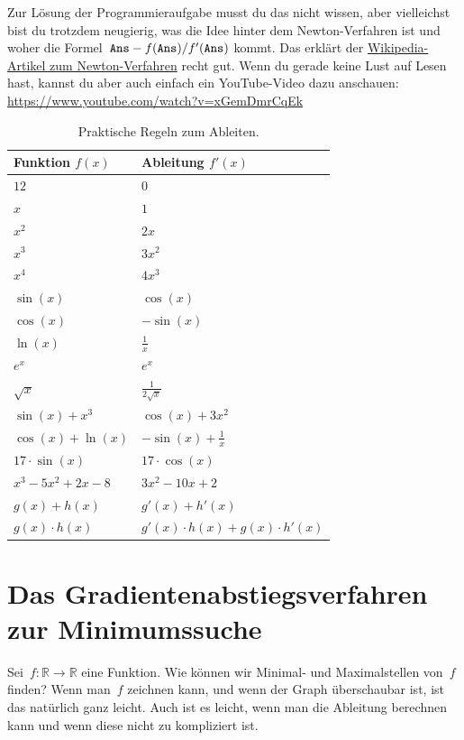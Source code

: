 \documentclass{blatt}
\newcommand{\RR}{\mathbb{R}}
\begin{document}
Zur Lösung der Programmieraufgabe musst du das nicht wissen, aber vielleichst
bist du trotzdem neugierig, was die Idee hinter dem Newton-Verfahren ist und
woher die Formel~$\texttt{Ans} - f(\texttt{Ans})/f'(\texttt{Ans})$ kommt. Das erklärt der
\href{https://de.wikipedia.org/wiki/Newton-Verfahren}{Wikipedia-Artikel zum
Newton-Verfahren} recht gut. Wenn du gerade keine Lust auf Lesen hast, kannst
du aber auch einfach ein YouTube-Video dazu anschauen:
\url{https://www.youtube.com/watch?v=xGemDmrCqEk}

\begin{table}
  \centering
  \begin{tabular}{ll}
    \toprule
    Funktion $f(x)$ & Ableitung $f'(x)$ \\\midrule
    $12$ & $0$ \\
    $x$ & $1$ \\
    $x^2$ & $2x$ \\
    $x^3$ & $3x^2$ \\
    $x^4$ & $4x^3$ \\
    $\sin(x)$ & $\cos(x)$ \\
    $\cos(x)$ & $-\sin(x)$ \\
    $\ln(x)$ & $\frac{1}{x}$ \\
    $e^x$ & $e^x$ \\
    $\sqrt{x}$ & $\frac{1}{2\sqrt{x}}$ \\
    $\sin(x)+x^3$ & $\cos(x)+3x^2$ \\
    $\cos(x)+\ln(x)$ & $-\sin(x)+\frac{1}{x}$ \\
    $17 \cdot \sin(x)$ & $17 \cdot \cos(x)$ \\
    $x^3-5x^2+2x-8$ & $3x^2-10x+2$ \\
    $g(x)+h(x)$ & $g'(x)+h'(x)$ \\
    $g(x) \cdot h(x)$ & $g'(x) \cdot h(x) + g(x) \cdot h'(x)$ \\
    \bottomrule
  \end{tabular}
  \caption{\label{tab:ableitungsregeln}Praktische Regeln zum Ableiten.}
\end{table}


\section{Das Gradientenabstiegsverfahren zur Minimumssuche}

Sei~$f : \RR \to \RR$ eine Funktion. Wie können wir Minimal- und Maximalstellen
von~$f$ finden? Wenn man~$f$ zeichnen kann, und wenn der Graph überschaubar
ist, ist das natürlich ganz leicht. Auch ist es leicht, wenn man die Ableitung
berechnen kann und wenn diese nicht zu kompliziert ist.
\end{document}
